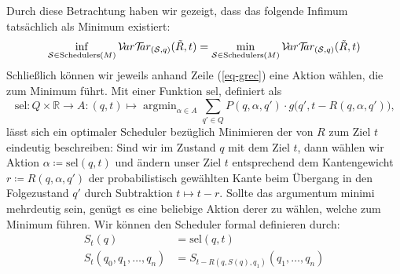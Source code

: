 \documentclass[a4paper]{article}
\DeclareMathOperator*{\argmin}{\arg\min}
\theoremstyle{nonumberplain}
\begin{document}
\medskip
Durch diese Betrachtung haben wir gezeigt, dass das folgende Infimum tatsächlich als Minimum existiert:
\begin{equation}
	\inf_{\mathcal{S} \in \mathrm{Schedulers}(M)}\mathcal{V}\!ar \mathcal{T}\!\!ar_{(\mathcal{S},q)}(\tilde{R},t) = \min_{\mathcal{S} \in \mathrm{Schedulers}(M)}\mathcal{V}\!ar \mathcal{T}\!\!ar_{(\mathcal{S},q)}(\tilde{R},t)
\end{equation}
\newcommand{\msel}{\mathrm{sel}}
Schließlich können wir jeweils anhand Zeile (\ref{eq-grec}) eine Aktion wählen, die zum Minimum führt. Mit einer Funktion $\msel$, definiert als
\begin{equation}
	\msel : Q \times \mathbb{R} \to A : (q,t) \mapsto \argmin_{\alpha \in A}{\sum_{q' \in Q} P(q,\alpha,q') \cdot g\big(q',t -R(q,\alpha,q')\big)}\text{,}
\end{equation}
lässt sich ein optimaler Scheduler bezüglich Minimieren der \vt{} von $R$ zum Ziel $t$ eindeutig beschreiben: Sind wir im Zustand $q$ mit dem Ziel $t$, dann wählen wir Aktion $\alpha \coloneqq \msel(q,t)$ und ändern unser Ziel $t$ entsprechend dem Kantengewicht $r \coloneqq R(q,\alpha,q')$ der probabilistisch gewählten Kante beim Übergang in den Folgezustand $q'$ durch Subtraktion $t \mapsto t - r$. Sollte das argumentum minimi mehrdeutig sein, genügt es eine beliebige Aktion derer zu wählen, welche zum Minimum führen.
Wir können den Scheduler formal definieren durch:
\begin{align}
S_t(q) &= \msel(q,t)\\
S_t(q_0, q_1,\dots,q_n) &= S_{t-R(q,S(q),q_1)}(q_1,\dots,q_n)
\end{align}
\end{document}

